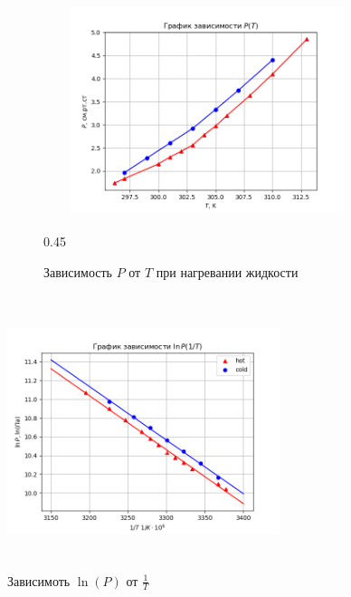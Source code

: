 \begin{figure}[h!]
    \centering
    \begin{figure}{0.45\linewidth}
        \includegraphics[width=8cm, height=8cm]{simpleplot.png}
        \caption{Зависимость $P$ от $T$ при нагревании жидкости}
    \end{figure}
    \begin{fiure}
        \includegraphics[width=8cm, height=8cm]{complexplot.png}
        \caption{Зависимоть $\ln(P)$ от $\frac{1}{T}$}
    \end{fiure}
\end{figure}

